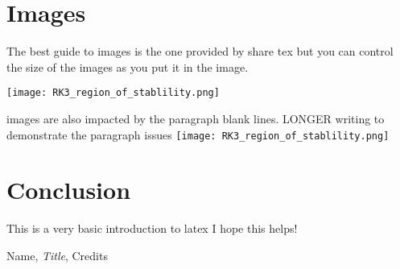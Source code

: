 \documentclass{article}
\begin{document}
\section{Images}
    The best guide to images is the one provided by share tex but you can control the size of the images as you put it in the image.
    
    \texttt{[image: RK3\_region\_of\_stablility.png]}
    
    images are also impacted by the paragraph blank lines. LONGER writing to demonstrate the paragraph issues
    \texttt{[image: RK3\_region\_of\_stablility.png]}

\section{Conclusion} 
    This is a very basic introduction to latex I hope this helps!
    
\begin{thebibliography}{1}

     {\sc Name}, {\em Title}, Credits

\end{thebibliography}
\end{document}
